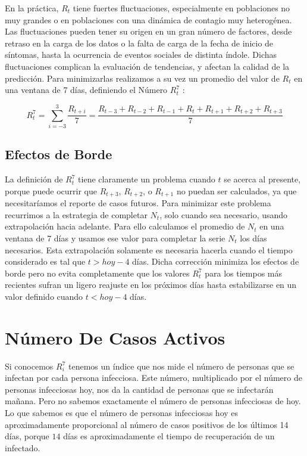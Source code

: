 \documentclass[12pt,a4paper]{article}
\begin{document}
En la práctica, $R_t$ tiene fuertes fluctuaciones, especialmente en poblaciones 
no muy grandes o en poblaciones con una dinámica de contagio muy heterogénea. 
Las fluctuaciones pueden tener su origen en un gran número de factores, 
desde retraso en la carga de los datos o la falta de carga de la 
fecha de inicio de síntomas, hasta la ocurrencia de eventos sociales de distinta índole. 
Dichas fluctuaciones complican la evaluación de tendencias, y afectan la calidad de la 
predicción. Para minimizarlas realizamos a su vez 
un promedio del valor de $R_t$ en una ventana de 7 días, 
definiendo el Número $R^7_t$ :

\begin{equation}
R^7_t = \sum_{i=-3}^{3} \frac{R_{t+i}}{7} = 
\frac{R_{t-3}+R_{t-2}+R_{t-1}+R_t+R_{t+1}+R_{t+2}+R_{t+3}}{7}
\label{eq:R7t}
\end{equation}

\subsection*{Efectos de Borde}
La definición de $R^7_t$ tiene claramente 
un problema cuando $t$ se acerca al presente, porque 
puede ocurrir que $R_{t+3}$, $R_{t+2}$, o $R_{t+1}$ no puedan 
ser calculados, ya que necesitaríamos el reporte de casos 
futuros. Para minimizar este problema recurrimos a la estrategia 
de completar $N_t$, solo cuando sea necesario, 
usando extrapolación hacia adelante. Para ello 
calculamos el promedio de $N_t$ en una ventana de 7 días 
y usamos ese valor para completar la serie $N_t$ los 
días necesarios. 
Esta extrapolación solamente es necesaria hacerla 
cuando el tiempo considerado es tal que $t>hoy-4$ días. Dicha corrección minimiza los efectos de borde 
pero no evita completamente que los valores 
$R^7_t$ para los tiempos más recientes 
sufran un ligero reajuste en los próximos días 
hasta estabilizarse en un valor definido 
cuando $t<hoy-4$ días.  

\section*{Número De Casos Activos}

Si conocemos $R^7_i$ tenemos un índice que nos mide el número de personas 
que se infectan por cada persona infecciosa. Este número,
multiplicado por el número de personas infecciosas hoy, nos da la 
cantidad de personas que se infectarán mañana.
Pero no sabemos exactamente el número de personas infecciosas de hoy. 
Lo que sabemos es que el número de personas infecciosas hoy es aproximadamente 
proporcional al número de casos positivos de los últimos 14 días, 
porque $14$ días es aproximadamente el tiempo de recuperación de un infectado.
\end{document}

